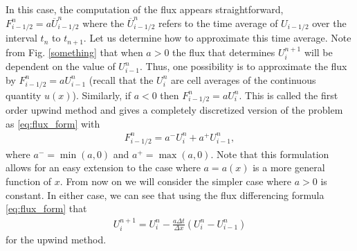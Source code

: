 In this case, the computation of the flux appears straightforward, $F_{i-1/2}^n = a\overline{U}^n_{i-1/2}$ where the $\overline{U}^n_{i-1/2}$ refers to the time average of $U_{i-1/2}$ over the interval $t_n$ to $t_{n+1}$.  Let us determine how to approximate this time average.  
Note from Fig. \ref{something} that when $a>0$ the flux that determines $U_i^{n+1}$ will be dependent on the value of $U_{i-1}^n$. Thus, one possibility is to approximate the flux by $F_{i-1/2}^n = aU_{i-1}^n$ (recall that the $U_i^n$ are cell averages of the continuous quantity $u(x)$). 
Similarly, if $a<0$ then $F_{i-1/2}^n = aU_{i}^n$.  
This is called the first order upwind method and gives a completely discretized version of the problem as \eqref{eq:flux_form} with
\begin{align*}
F_{i-1/2}^n = a^- U_i^n + a^+U_{i-1}^n,
\end{align*}
where $a^- = \min (a,0)$ and $a^+ = \max (a,0)$.  Note that this formulation allows for an easy extension to the case where $a=a(x)$ is a more general function of $x$.  From now on we will consider the simpler case where $a>0$ is constant.
In either case, we can see that using the flux differencing formula \eqref{eq:flux_form} that
\begin{align*}
U_i^{n+1} = U_i^n - \frac{a\Delta t}{\Delta x}\left(U_i^n-U_{i-1}^n\right)
\end{align*}
for the upwind method.


